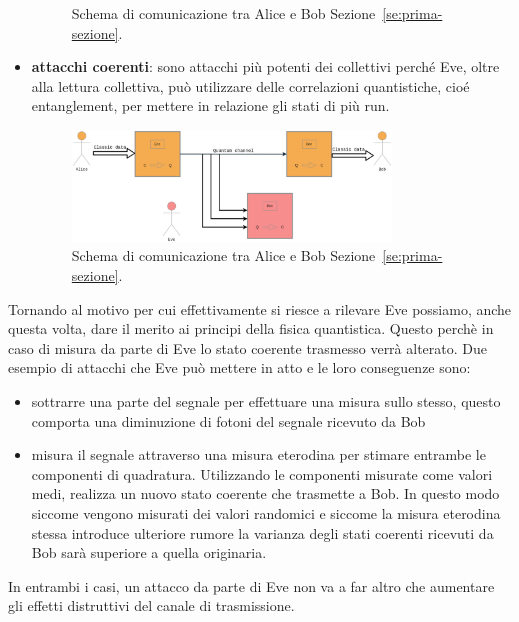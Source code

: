 \begin{itemize}
\begin{figure}[tbp]
\begin{center}
\end{center}
\caption{Schema di comunicazione tra Alice e Bob Sezione~\ref{se:prima-sezione}.} \label{fig:figura-doppia}
\end{figure}
\item \textbf{attacchi coerenti}: sono attacchi pi\`u potenti dei collettivi perché Eve, oltre alla lettura collettiva, può utilizzare delle correlazioni quantistiche, cioé entanglement, per mettere in relazione gli stati di pi\`u run.
\begin{figure}[tbp] 
\begin{center}
\includegraphics[width=0.8\textwidth]{figure/collective_attack.eps} 
\end{center}
\caption{Schema di comunicazione tra Alice e Bob Sezione~\ref{se:prima-sezione}.} \label{fig:figura-doppia}
\end{figure}
\end{itemize} 

Tornando al motivo per cui effettivamente si riesce a rilevare Eve possiamo, anche questa volta, dare il merito ai principi della fisica quantistica. Questo perch\`e in caso di misura da parte di Eve lo stato coerente trasmesso verr\`a alterato. Due esempio di attacchi che Eve pu\`o mettere in atto e le loro conseguenze sono: 
\begin{itemize}
\item sottrarre una parte del segnale per effettuare una misura sullo stesso, questo comporta una diminuzione di fotoni del segnale ricevuto da Bob
\item misura il segnale attraverso una misura eterodina per stimare entrambe le componenti di quadratura. Utilizzando le componenti misurate come valori medi, realizza un nuovo stato coerente che trasmette a Bob. In questo modo siccome vengono misurati dei valori randomici e siccome la misura eterodina stessa introduce ulteriore rumore la varianza degli stati coerenti ricevuti da Bob sar\`a superiore a quella originaria. 
\end{itemize} 
In entrambi i casi, un attacco da parte di Eve non va a far altro che aumentare gli effetti distruttivi del canale di trasmissione.


